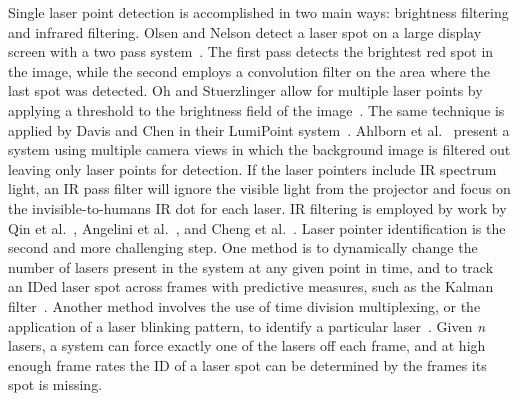 \documentclass[runningheads,a4paper]{llncs}
\begin{document}
Single laser point detection is accomplished in two main ways:
brightness filtering and infrared filtering.  Olsen and Nelson detect
a laser spot on a large display screen with a two pass
system~\cite{olsen2001}.  The first pass detects the brightest red
spot in the image, while the second 
employs a convolution filter 
on the area where the last spot was
detected.  Oh and Stuerzlinger allow for multiple laser points by
applying a threshold to the brightness field of the
image~\cite{Oh02laserpointers}.  The same technique is applied by Davis
and Chen in their LumiPoint system~\cite{Davis00lumipoint:multi-user}.
Ahlborn et al.~\cite{Ahlborn:2005:PSL:1101616.1101637} present a
system using multiple camera views in which the background image is
filtered out leaving only laser points for detection.  If the laser
pointers include IR spectrum light, an IR pass filter 
will
ignore the visible light from the projector and focus on the
invisible-to-humans IR dot for each laser.  IR filtering is employed
by work by Qin et al.~\cite{Qin:2010:SLP:1842993.1843022}, Angelini et
al.~\cite{angelini:multi-user}, and Cheng et
al.~\cite{Cheng:2003:DIL:857080.857088}.
%
Laser pointer identification is the second and more challenging step.
One method is to
dynamically change the number of lasers present in the system at any
given point in time, and to track an IDed laser spot across frames
with predictive measures, such as the Kalman
filter~\cite{Oh02laserpointers,Davis00lumipoint:multi-user,Cheng:2003:DIL:857080.857088}.
%
%
Another method involves the use of time division multiplexing, or the
 application of a laser blinking pattern, to identify a particular
 laser~\cite{Vogt:2004:ECG:1009379.1009663,Vogt03trackingmultiple,Pavlovych04laserpointers}.
% 
Given \emph{n} lasers, a system can force exactly one of the
lasers off each frame,
and at high enough frame rates the ID of a laser spot can be determined by the frames its spot is missing.
\end{document}

